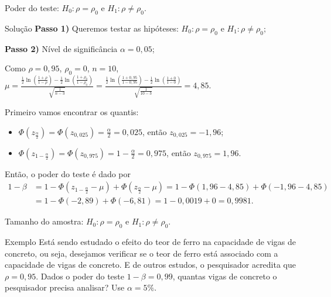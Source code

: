 \documentclass[9pt]{beamer}
\begin{document}
\begin{frame}{Poder do teste: $H_0:\rho = \rho_0$ e $H_1: \rho \neq \rho_0$.}
\begin{block}{Solução}
	\textbf{Passo 1)} Queremos testar as hipóteses: $H_0: \rho = \rho_0$ e $H_1: \rho \neq \rho_0$;
	
	\textbf{Passo 2)} Nível de significância $\alpha=0,05$;
	
	Como $\rho = 0,95$, $\rho_0 = 0$, $n  =10$, $\mu = \frac{\frac{1}{2}\ln \left(\frac{1 + \rho}{1 - \rho}\right) - \frac{1}{2}\ln \left(\frac{1 + \rho_0}{1 - \rho_0}\right)}{\sqrt{\frac{1}{n-3}}} =\allowbreak \frac{\frac{1}{2}\ln \left(\frac{1 + 0,95}{1 - 0,95}\right) - \frac{1}{2}\ln \left(\frac{1 + 0}{1 - 0}\right)}{\sqrt{\frac{1}{10-3}}} = 4,85$. 
	
	Primeiro vamos encontrar os quantis:
	\begin{itemize}
		\item $\Phi\left( z_\frac{\alpha}{2} \right) = \Phi\left( z_{0,025} \right) = \frac{\alpha}{2} = 0,025$, então $z_{0,025} = -1,96$;
		\item $\Phi\left( z_{1-\frac{\alpha}{2}} \right) = \Phi\left( z_{0,975} \right) = 1-\frac{\alpha}{2} = 0,975$, então $z_{0,975} = 1,96$.
	\end{itemize}

	Então, o poder do teste é dado por
	\begin{align*}
		1-\beta &= 1 - \Phi\left( z_{1-\frac{\alpha}{2}} - \mu \right) + \Phi\left( z_{\frac{\alpha}{2}} - \mu \right) = 1 - \Phi\left(1,96 - 4,85\right) + \Phi\left( -1,96 - 4,85 \right)\\
		&= 1- \Phi\left( -2,89 \right) + \Phi\left( -6,81 \right) = 1  - 0,0019 + 0 = 0,9981.
	\end{align*}
\end{block}

\end{frame}

\begin{frame}{Tamanho do amostra: $H_0:\rho = \rho_0$ e $H_1: \rho \neq \rho_0$.}

\begin{block}{Exemplo}
	Está sendo estudado o efeito do teor de ferro na capacidade de vigas de concreto, ou seja, desejamos verificar se o teor de ferro está associado com a capacidade de vigas de concreto. E de outros estudos, o pesquisador acredita que $\rho = 0,95$. Dados o poder do teste $1-\beta = 0,99$, quantas vigas de concreto o pesquisador precisa analisar? Use $\alpha=5\%$.
	
\end{block}

\end{frame}
\end{document}
